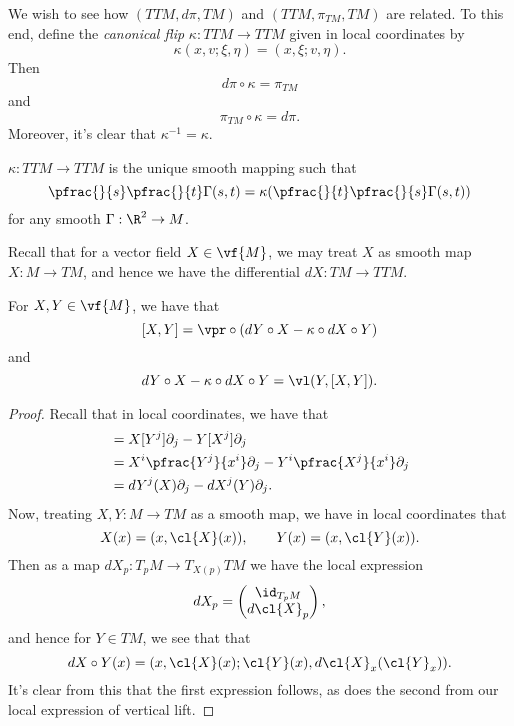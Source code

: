 We wish to see how $(TTM, d\pi, TM)$ and $(TTM, \pi_{TM}, TM)$ are related.  To this end, define the \textit{canonical flip} $\kappa:TTM\to TTM$ given in local coordinates by
$$\kappa(x,v;\xi,\eta)=(x,\xi;v,\eta).$$
Then
$$d\pi\circ\kappa=\pi_{TM}$$
and
$$\pi_{TM}\circ\kappa=d\pi.$$
Moreover, it's clear that $\kappa^{-1}=\kappa$.

\begin{prop}
    $\kappa:TTM\to TTM$ is the unique smooth mapping such that
    $$\pfrac{}{s}\pfrac{}{t}\Gamma(s,t)=\kappa(\pfrac{}{t}\pfrac{}{s}\Gamma(s,t))$$
    for any smooth $\Gamma:\R^2\to M$.
\end{prop}

Recall that for a vector field $X\in\vf{M}$, we may treat $X$ as smooth map $X:M\to TM$, and hence we have the differential $dX:TM\to TTM$.

\begin{prop}
    For $X,Y\in\vf{M}$, we have that
    $$[X,Y]=\vpr\circ(dY\circ X-\kappa\circ dX\circ Y)$$
    and
    $$dY\circ X-\kappa\circ dX\circ Y=\vl(Y,[X,Y]).$$
\end{prop}

\begin{proof}
Recall that in local coordinates, we have that
\begin{align*}
	[X,Y]&=X[Y^j]\partial_j-Y[X^j]\partial_j\\
	&=X^i\pfrac{Y^j}{x^i}\partial_j-Y^i\pfrac{X^j}{x^i}\partial_j\\
	&=dY^j(X)\partial_j-dX^j(Y)\partial_j.
\end{align*}
Now, treating $X,Y:M\to TM$ as a smooth map, we have in local coordinates that
$$X(x)=(x,\cl{X}(x)),\qquad Y(x)=(x,\cl{Y}(x)).$$
Then as a map $dX_p:T_pM\to T_{X(p)}TM$ we have the local expression
$$dX_p=
\begin{pmatrix}
\id_{T_pM}\\
d\cl{X}_p
\end{pmatrix},$$
and hence for $Y\in TM$, we see that that
$$dX\circ Y(x)=(x,\cl{X}(x);\cl{Y}(x),d\cl{X}_x(\cl{Y}_x)).$$
It's clear from this that the first expression follows, as does the second from our local expression of vertical lift.
\end{proof}



 
 
















